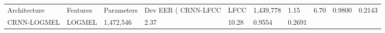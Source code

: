 \begin{tabular}{lllllll}
\toprule
Architecture & Features & Parameters & Dev EER (%
\midrule
CRNN-LFCC & LFCC & 1,439,778 & 1.15 & 6.70 & 0.9800 & 0.2143 \\
CRNN-LOGMEL & LOGMEL & 1,472,546 & 2.37 & 10.28 & 0.9554 & 0.2691 \\
\bottomrule
\end{tabular}
